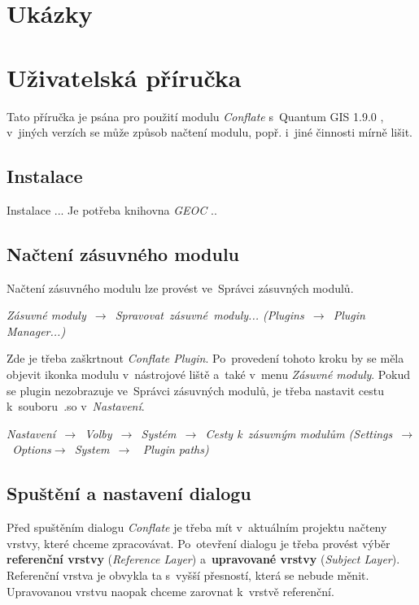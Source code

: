 \section{Ukázky}
\label{plugin-ukazky}


\section{Uživatelská příručka} %
\label{prirucka}

Tato příručka je psána pro použití modulu \textit{Conflate} s~Quantum GIS 1.9.0 , 
v~jiných verzích se může způsob načtení modulu, popř. i~jiné činnosti mírně lišit.

\subsection{Instalace}
\label{prirucka-instalace}
Instalace ... Je potřeba knihovna \textit{GEOC} ..


\subsection{Načtení zásuvného modulu}
\label{prirucka-nacteni}

Načtení zásuvného modulu lze provést ve~Správci zásuvných modulů.
\begin{center}
\textit{Zásuvné moduly~$\rightarrow$~Spravovat~zásuvné~moduly... 
(Plugins~$\rightarrow$~Plugin Manager...)}
\end{center}
Zde je třeba zaškrtnout \textit{Conflate Plugin}. Po~provedení tohoto kroku by se 
měla objevit ikonka modulu v~nástrojové liště a~také v~menu \textit{Zásuvné moduly}. 
Pokud se plugin nezobrazuje ve~Správci zásuvných modulů, je třeba nastavit cestu 
k~souboru~.so v~\textit{Nastavení}.
\begin{center} 
\textit{Nastavení~$\rightarrow$~Volby~$\rightarrow$~Systém~$\rightarrow$~Cesty 
k~zásuvným modulům (Settings~$\rightarrow$~Options$\rightarrow$~System~$\rightarrow$
~Plugin paths)}
\end{center}


\subsection{Spuštění a nastavení dialogu}
\label{prirucka-spusteni}

Před spuštěním dialogu \textit{Conflate} je třeba mít v~aktuálním projektu 
načteny vrstvy, které chceme zpracovávat. Po~otevření dialogu je třeba provést 
výběr \textbf{referenční vrstvy} (\textit{Reference Layer}) a~\textbf{upravované 
vrstvy} (\textit{Subject Layer}). Referenční vrstva je obvykla ta s~vyšší 
přesností, která se nebude měnit. Upravovanou vrstvu naopak chceme zarovnat 
k~vrstvě referenční.

